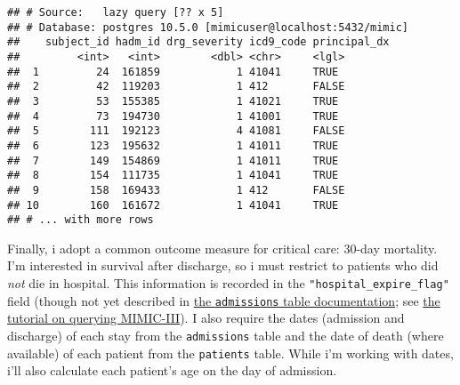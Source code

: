 \documentclass[]{article}
\newenvironment{Shaded}{\begin{snugshade}}{\end{snugshade}}
\newcommand{\KeywordTok}[1]{\textcolor[rgb]{0.13,0.29,0.53}{\textbf{#1}}}
\newcommand{\DataTypeTok}[1]{\textcolor[rgb]{0.13,0.29,0.53}{#1}}
\newcommand{\DecValTok}[1]{\textcolor[rgb]{0.00,0.00,0.81}{#1}}
\newcommand{\StringTok}[1]{\textcolor[rgb]{0.31,0.60,0.02}{#1}}
\newcommand{\OperatorTok}[1]{\textcolor[rgb]{0.81,0.36,0.00}{\textbf{#1}}}
\newcommand{\NormalTok}[1]{#1}
\begin{document}
\begin{Shaded}
\end{Shaded}

\begin{verbatim}
## # Source:   lazy query [?? x 5]
## # Database: postgres 10.5.0 [mimicuser@localhost:5432/mimic]
##    subject_id hadm_id drg_severity icd9_code principal_dx
##         <int>   <int>        <dbl> <chr>     <lgl>       
##  1         24  161859            1 41041     TRUE        
##  2         42  119203            1 412       FALSE       
##  3         53  155385            1 41021     TRUE        
##  4         73  194730            1 41001     TRUE        
##  5        111  192123            4 41081     FALSE       
##  6        123  195632            1 41011     TRUE        
##  7        149  154869            1 41011     TRUE        
##  8        154  111735            1 41041     TRUE        
##  9        158  169433            1 412       FALSE       
## 10        160  161672            1 41041     TRUE        
## # ... with more rows
\end{verbatim}

Finally, i adopt a common outcome measure for critical care: 30-day
mortality. I'm interested in survival after discharge, so i must
restrict to patients who did \emph{not} die in hospital. This
information is recorded in the \texttt{"hospital\_expire\_flag"} field
(though not yet described in
\href{https://mimic.physionet.org/mimictables/admissions/}{the
\texttt{admissions} table documentation}; see
\href{https://mimic.physionet.org/tutorials/intro-to-mimic-iii/}{the
tutorial on querying MIMIC-III}). I also require the dates (admission
and discharge) of each stay from the \texttt{admissions} table and the
date of death (where available) of each patient from the
\texttt{patients} table. While i'm working with dates, i'll also
calculate each patient's age on the day of admission.
\end{document}
